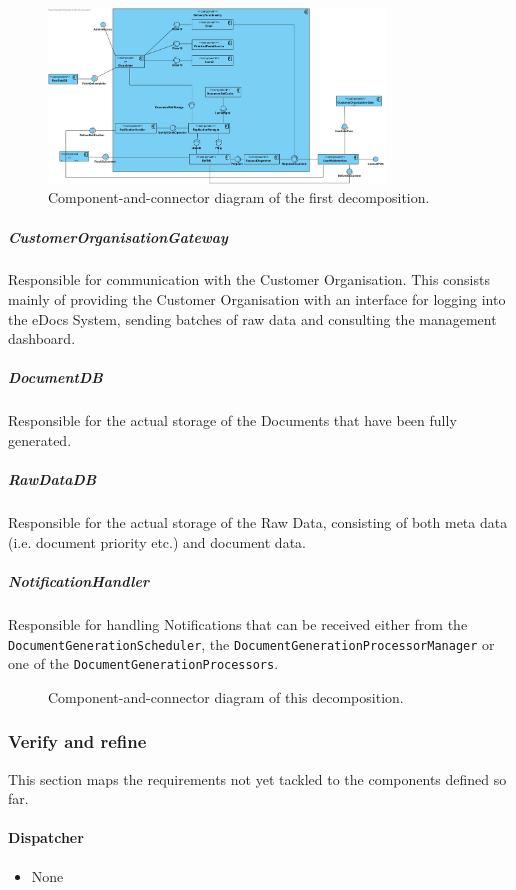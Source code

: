 \documentclass[a4paper,10pt]{article}
\begin{document}
\begin{figure}[!htp]
	\centering
	\includegraphics[width=0.8\textwidth]{DeliveryFunctionality.png}
	\caption{Component-and-connector diagram of the first decomposition.
	}\label{fig:compandcondecomp2}
\end{figure}
\subparagraph{CustomerOrganisationGateway}
Responsible for communication with the Customer Organisation. This consists mainly of providing the Customer Organisation with an interface for logging into the eDocs System, sending batches of raw data and consulting the management dashboard.

\subparagraph{DocumentDB}
Responsible for the actual storage of the Documents that have been fully generated.

\subparagraph{RawDataDB}
Responsible for the actual storage of the Raw Data, consisting of both meta data (i.e. document priority etc.) and document data.

\subparagraph{NotificationHandler}
Responsible for handling Notifications that can be received either from the \texttt{DocumentGenerationScheduler}, the \texttt{DocumentGenerationProcessorManager} or one of the \texttt{DocumentGenerationProcessors}.

\begin{figure}[!htp]
	\centering
	\caption{Component-and-connector diagram of this decomposition.
	}\label{fig:it1-cc_main}
\end{figure}
\subsubsection{Verify and refine}
This section maps the requirements not yet tackled to the components defined so far.
\paragraph{Dispatcher}
\begin{itemize}
	\item None
\end{itemize}
\end{document}
